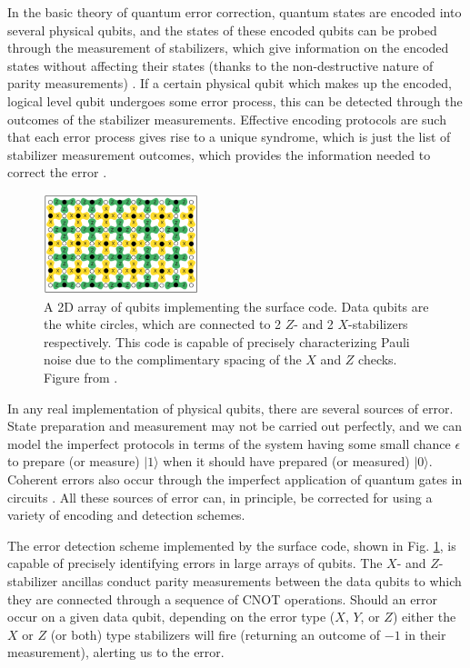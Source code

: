 In the basic theory of quantum error correction, quantum states are encoded into
several physical qubits, and the states of these encoded qubits can be probed
through the measurement of stabilizers, which give information on the encoded
states without affecting their states (thanks to the non-destructive nature of
parity measurements) \cite{nielsen_chuang_2010}. If a certain physical qubit
which makes up the encoded, logical level qubit undergoes some error process,
this can be detected through the outcomes of the stabilizer measurements.
Effective encoding protocols are such that each error process gives rise to a
unique syndrome, which is just the list of stabilizer measurement outcomes,
which provides the information needed to correct the error \cite{fowler12_surfac_codes}.

\begin{figure}
  \centering
  \includegraphics[width=0.4\textwidth]{images/surface_code.png}
  \caption{A 2D array of qubits implementing the surface code. Data qubits are
    the white circles, which are connected to 2 $Z$- and 2 $X$-stabilizers
    respectively. This code is capable of precisely characterizing Pauli noise
    due to the complimentary spacing of the $X$ and $Z$ checks. Figure from
    \cite{fowler12_surfac_codes}.}
  \label{fig:surface_code}
\end{figure}

In any real implementation of physical qubits, there are several sources of
error. State preparation and measurement may not be carried out perfectly, and
we can model the imperfect protocols in terms of the system having some small
chance $\epsilon$ to prepare (or measure) $|1\rangle$ when it should have
prepared (or measured) $|0\rangle$. Coherent errors also occur through the
imperfect application of quantum gates in circuits \cite{Devitt_2013}. All these
sources of error can, in principle, be corrected for using a variety of encoding
and detection schemes.

The error detection scheme implemented by the surface code, shown in Fig.
\ref{fig:surface_code}, is capable of precisely identifying errors in large
arrays of qubits. The $X$- and $Z$-stabilizer ancillas conduct parity
measurements between the data qubits to which they are connected through a
sequence of CNOT operations. Should an error occur on a given data qubit,
depending on the error type ($X$, $Y$, or $Z$) either the $X$ or $Z$ (or both)
type stabilizers will fire (returning an outcome of $-1$ in their measurement),
alerting us to the error.

